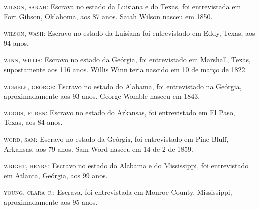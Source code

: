 \begin{Parskip}
\textsc{wilson, sarah:} Escrava no estado da Luisiana e do Texas, foi
entrevistada em Fort Gibson, Oklahoma, aos 87 anos. Sarah Wilson nasceu
em 1850.

\textsc{wilson, wash:} Escravo no estado da Luisiana foi entrevistado em
Eddy, Texas, aos 94 anos.

\textsc{winn, willis:} Escravo no estado da Geórgia, foi entrevistado em
Marshall, Texas, supostamente aos 116 anos. Willis Winn teria nascido em
10 de março de 1822.

\textsc{womble, george:} Escravo no estado do Alabama, foi entrevistado
na Geórgia, aproximadamente aos 93 anos. George Womble nasceu em 1843.

\textsc{woods, ruben:} Escravo no estado do Arkansas, foi entrevistado
em El Paso, Texas, aos 84 anos.

\textsc{word, sam:} Escravo no estado da Geórgia, foi entrevistado em
Pine Bluff, Arkansas, aos 79 anos. Sam Word nasceu em 14 de 2 de 1859.

\textsc{wright, henry:} Escravo no estado do Alabama e do Mississippi,
foi entrevistado em Atlanta, Geórgia, aos 99 anos.

\textsc{young, clara c.:} Escrava, foi entrevistada em Monroe County,
Mississippi, aproximadamente aos 95 anos.
\end{Parskip}